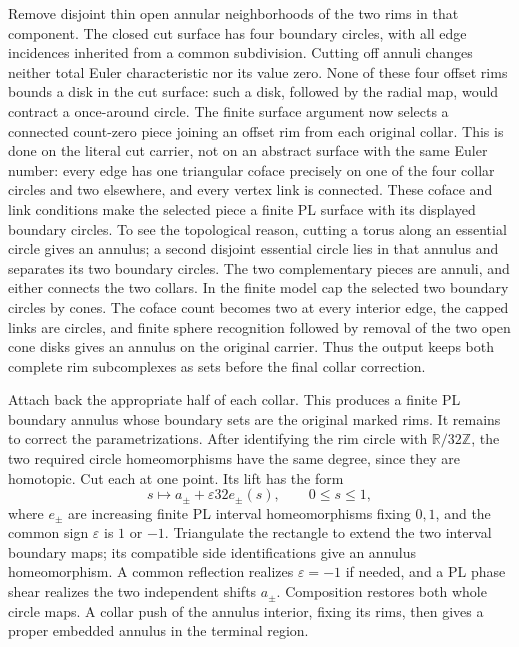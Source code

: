 Remove disjoint thin open annular neighborhoods of the two rims in
that component.  The closed cut surface has four boundary circles,
with all edge incidences inherited from a common subdivision.  Cutting
off annuli changes neither total Euler characteristic nor its value
zero.  None of these four offset rims bounds a disk in the cut surface:
such a disk, followed by the radial map, would contract a once-around
circle.  The finite surface argument now selects a connected
count-zero piece joining an offset rim from each original collar.
This is done on the literal cut carrier, not on an abstract surface
with the same Euler number: every edge has one triangular coface
precisely on one of the four collar circles and two elsewhere, and
every vertex link is connected.  These coface and link conditions make
the selected piece a finite PL surface with its displayed boundary
circles.  To see the topological reason, cutting a torus along an
essential circle gives an annulus; a second disjoint essential circle
lies in that annulus and separates its two boundary circles.  The two
complementary pieces are annuli, and either connects the two collars.
In the finite model cap the selected two boundary circles by cones.
The coface count becomes two at every interior edge, the capped links
are circles, and finite sphere recognition followed by removal of the
two open cone disks gives an annulus on the original carrier.  Thus
the output keeps both complete rim subcomplexes as sets before the
final collar correction.

Attach back the appropriate half of each collar.  This produces a
finite PL boundary annulus whose boundary sets are the original
marked rims.  It remains to correct the parametrizations.  After
identifying the rim circle with $\mathbb R/32\mathbb Z$, the two
required circle homeomorphisms have the same degree, since they are
homotopic.  Cut each at one point.  Its lift has the form
\[
       s\longmapsto a_\pm+\varepsilon32 e_\pm(s),
       \qquad 0\leq s\leq1,
\]
where $e_\pm$ are increasing finite PL interval homeomorphisms
fixing $0,1$, and the common sign $\varepsilon$ is $1$ or $-1$.
Triangulate the rectangle to extend the two interval boundary maps;
its compatible side identifications give an annulus homeomorphism.
A common reflection realizes $\varepsilon=-1$ if needed, and a PL
phase shear realizes the two independent shifts $a_\pm$.
Composition restores both whole circle maps.  A collar push of the
annulus interior, fixing its rims, then gives a proper embedded
annulus in the terminal region.


